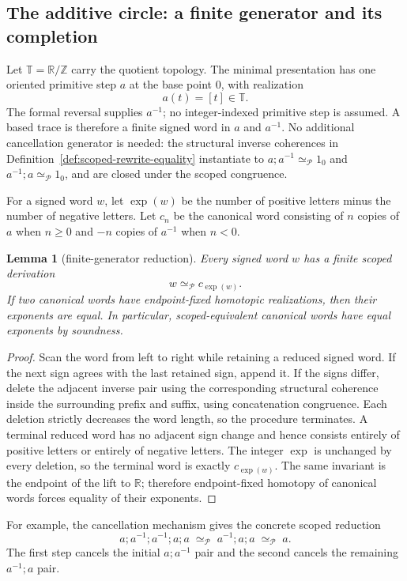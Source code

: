 \documentclass[10pt,reqno]{amsart}
\theoremstyle{definition}
\theoremstyle{plain}
\newtheorem{lemma}[definition]{Lemma}
\theoremstyle{remark}
\newcommand{\RwEq}{\mathrel{\simeq_{\!\mathcal P}}}
\begin{document}
\subsection{The additive circle: a finite generator and its completion}

Let $\mathbb T=\mathbb R/\mathbb Z$ carry the quotient topology.  The minimal
presentation has one oriented primitive step $a$ at the base point $0$, with
realization
\[
  a(t)=[t]\in\mathbb T.
\]
The formal reversal supplies $a^{-1}$; no integer-indexed primitive step is
assumed.  A based trace is therefore a finite signed word in $a$ and
$a^{-1}$.  No additional cancellation generator is needed: the structural
inverse coherences in Definition~\ref{def:scoped-rewrite-equality} instantiate to
\(a;a^{-1}\RwEq1_0\) and \(a^{-1};a\RwEq1_0\), and are closed under the
scoped congruence.

For a signed word $w$, let $\operatorname{exp}(w)$ be the number of positive
letters minus the number of negative letters.  Let $c_n$ be the canonical
word consisting of $n$ copies of $a$ when $n\geq 0$ and $-n$ copies of
$a^{-1}$ when $n<0$.

\begin{lemma}[finite-generator reduction]
Every signed word $w$ has a finite scoped derivation
\[
  w\RwEq c_{\operatorname{exp}(w)}.
\]
If two canonical words have endpoint-fixed homotopic realizations, then their
exponents are equal.  In particular, scoped-equivalent canonical words have
equal exponents by soundness.
\end{lemma}

\begin{proof}
Scan the word from left to right while retaining a reduced signed word.  If
the next sign agrees with the last retained sign, append it.  If the signs
differ, delete the adjacent inverse pair using the corresponding structural
coherence inside the surrounding prefix and suffix, using concatenation
congruence.  Each deletion strictly decreases the word length, so the
procedure terminates.  A terminal reduced word has no adjacent sign change
and hence consists entirely of positive letters or entirely of negative
letters.  The integer $\operatorname{exp}$ is unchanged by every deletion,
so the terminal word is exactly $c_{\operatorname{exp}(w)}$.  The same
invariant is the endpoint of the lift to $\mathbb R$; therefore endpoint-fixed
homotopy of canonical words forces equality of their exponents.
\end{proof}

For example, the cancellation mechanism gives the concrete scoped reduction
\[
  a;a^{-1};a^{-1};a;a
  \;\RwEq\;a^{-1};a;a
  \;\RwEq\;a.
\]
The first step cancels the initial $a;a^{-1}$ pair and the second cancels the
remaining $a^{-1};a$ pair.
\end{document}
